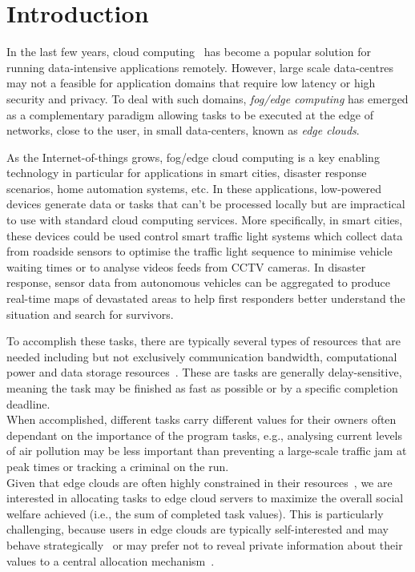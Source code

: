 \section{Introduction}
\label{sec:introduction}
In the last few years, cloud computing~\cite{cloud_cite} has become a popular solution for running data-intensive
applications remotely. However, large scale data-centres may not a feasible for application domains that require low
latency or high security and privacy. To deal with such domains, \emph{fog/edge computing} has emerged as a
complementary paradigm allowing tasks to be executed at the edge of networks, close to the user, in small data-centers,
known as \emph{edge clouds}.

As the Internet-of-things grows, fog/edge cloud computing is a key enabling technology in particular for applications
in smart cities, disaster response scenarios, home automation systems, etc. In these applications, low-powered devices
generate data or tasks that can't be processed locally but are impractical to use with standard cloud computing
services. More specifically, in smart cities, these devices could be used control smart traffic light systems which
collect data from roadside sensors to optimise the traffic light sequence to minimise vehicle waiting times or to
analyse videos feeds from CCTV cameras. In disaster response, sensor data from autonomous vehicles can be aggregated
to produce real-time maps of devastated areas to help first responders better understand the situation and search for
survivors.

To accomplish these tasks, there are typically several types of resources that are needed including but not exclusively
communication bandwidth, computational power and data storage resources~\cite{vaji_infocom}. These are tasks are
generally delay-sensitive, meaning the task may be finished as fast as possible or by a specific completion deadline. \\
When accomplished, different tasks carry different values for their owners often dependant on the importance of the
program tasks, e.g., analysing current levels of air pollution may be less important than preventing a large-scale
traffic jam at peak times or tracking a criminal on the run. \\
Given that edge clouds are often highly constrained in their resources~\cite{edge_limitations}, we are interested in
allocating tasks to edge cloud servers to maximize the overall social welfare achieved (i.e., the sum of completed task
values). This is particularly challenging, because users in edge clouds are typically self-interested and may behave
strategically~\cite{Bi2019} or may prefer not to reveal private information about their values to a central allocation
mechanism~\cite{Pai2013}.

